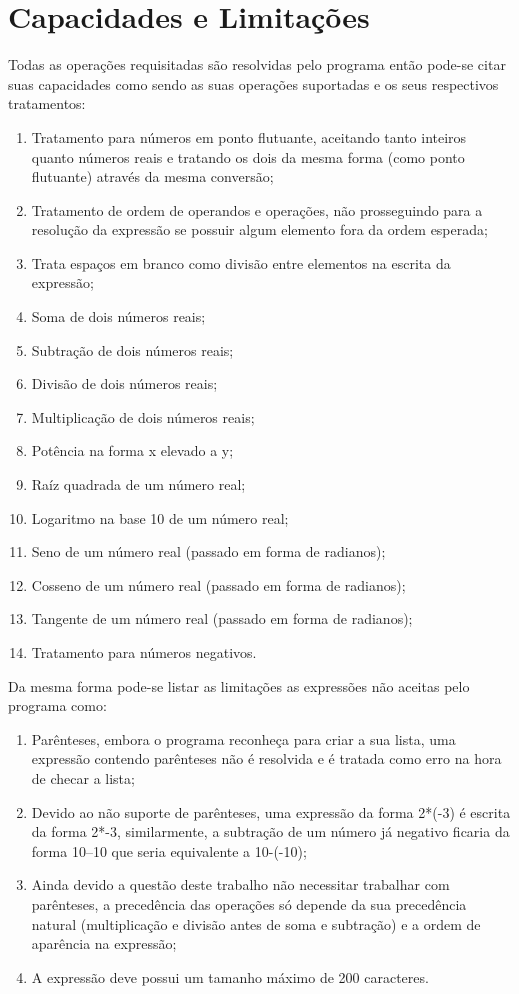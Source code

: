 \documentclass[12pt]{article}
\begin{document}
\section*{Capacidades e Limitações}

Todas as operações requisitadas são resolvidas pelo programa então pode-se citar suas capacidades como sendo as suas operações suportadas e os seus respectivos tratamentos:

\begin{enumerate}
\item Tratamento para números em ponto flutuante, aceitando tanto inteiros quanto números reais e tratando os dois da mesma forma (como ponto flutuante) através da mesma conversão;
\item Tratamento de ordem de operandos e operações, não prosseguindo para a resolução da expressão se possuir algum elemento fora da ordem esperada;
\item Trata espaços em branco como divisão entre elementos na escrita da expressão;
\item Soma de dois números reais;
\item Subtração de dois números reais;
\item Divisão de dois números reais;
\item Multiplicação de dois números reais;
\item Potência na forma x elevado a y;
\item Raíz quadrada de um número real;
\item Logaritmo na base 10 de um número real;
\item Seno de um número real (passado em forma de radianos);
\item Cosseno de um número real (passado em forma de radianos);
\item Tangente de um número real (passado em forma de radianos);
\item Tratamento para números negativos.
\end{enumerate}

Da mesma forma pode-se listar as limitações as expressões não aceitas pelo programa como:

\begin{enumerate}
\item Parênteses, embora o programa reconheça para criar a sua lista, uma expressão contendo parênteses não é resolvida e é tratada como erro na hora de checar a lista;
\item Devido ao não suporte de parênteses, uma expressão da forma 2*(-3) é escrita da forma 2*-3, similarmente, a subtração de um número já negativo ficaria da forma 10--10 que seria equivalente a 10-(-10);
\item Ainda devido a questão deste trabalho não necessitar trabalhar com parênteses, a precedência das operações só depende da sua precedência natural (multiplicação e divisão antes de soma e subtração) e a ordem de aparência na expressão;
\item A expressão deve possui um tamanho máximo de 200 caracteres.
\end{enumerate}
\end{document}

